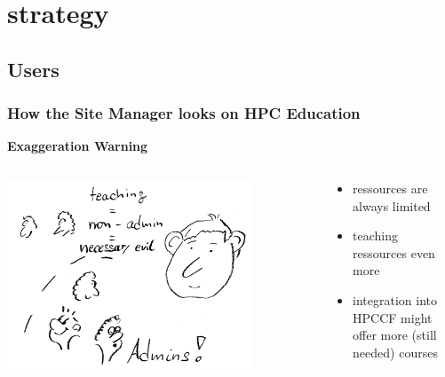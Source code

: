 \section[Certification Strategy]{strategy}

\subsection[What's in for Users]{Users}


\begin{frame}
  \frametitle{How the Site Manager looks on HPC Education}
  \centering
  {\bcattention \bf \large Exaggeration Warning \bcattention}
  \begin{columns}
   \begin{column}{0.6\textwidth}
    \centering
    \includegraphics[width=0.8\textwidth]{images/runner}
   \end{column}
   \begin{column}{0.4\textwidth}
    \pause
    \begin{itemize}[<+->]
     \item ressources are always limited
     \item teaching ressources even more
     \item integration into HPCCF might offer more (still needed) courses
    \end{itemize}
   \end{column}
  \end{columns}
\end{frame}

